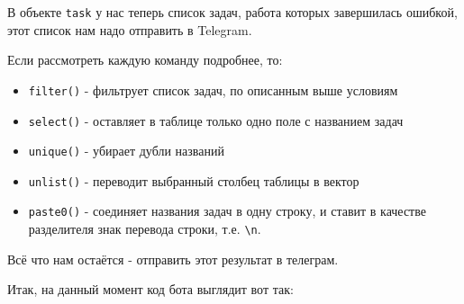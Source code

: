 \documentclass[
]{book}
\newenvironment{Shaded}{\begin{snugshade}}{\end{snugshade}}
\newcommand{\AttributeTok}[1]{\textcolor[rgb]{0.77,0.63,0.00}{#1}}
\newcommand{\FunctionTok}[1]{\textcolor[rgb]{0.00,0.00,0.00}{#1}}
\newcommand{\NormalTok}[1]{#1}
\newcommand{\SpecialCharTok}[1]{\textcolor[rgb]{0.00,0.00,0.00}{#1}}
\newcommand{\StringTok}[1]{\textcolor[rgb]{0.31,0.60,0.02}{#1}}
\providecommand{\tightlist}{%
  \setlength{\itemsep}{0pt}\setlength{\parskip}{0pt}}
\begin{document}
В объекте \texttt{task} у нас теперь список задач, работа которых завершилась ошибкой, этот список нам надо отправить в Telegram.

Если рассмотреть каждую команду подробнее, то:

\begin{itemize}
\tightlist
\item
  \texttt{filter()} - фильтрует список задач, по описанным выше условиям
\item
  \texttt{select()} - оставляет в таблице только одно поле с названием задач
\item
  \texttt{unique()} - убирает дубли названий
\item
  \texttt{unlist()} - переводит выбранный столбец таблицы в вектор
\item
  \texttt{paste0()} - соединяет названия задач в одну строку, и ставит в качестве разделителя знак перевода строки, т.е. \texttt{\textbackslash{}n}.
\end{itemize}

Всё что нам остаётся - отправить этот результат в телеграм.

\begin{Shaded}
\end{Shaded}

Итак, на данный момент код бота выглядит вот так:
\end{document}
